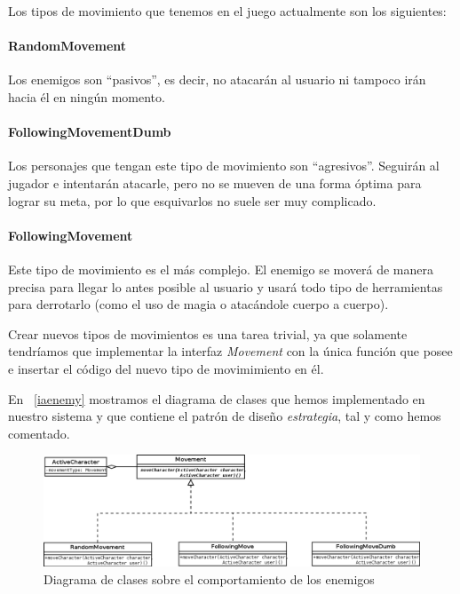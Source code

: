 Los tipos de movimiento que tenemos en el juego actualmente son los siguientes:

\paragraph{RandomMovement} Los enemigos son ``pasivos'', es decir, no atacarán al usuario ni tampoco irán hacia él en ningún momento.

\paragraph{FollowingMovementDumb} Los personajes que tengan este tipo de movimiento son ``agresivos''. Seguirán al jugador e intentarán atacarle, pero no se mueven de una forma óptima para lograr su meta, por lo que esquivarlos no suele ser muy complicado.

\paragraph{FollowingMovement} Este tipo de movimiento es el más complejo. El enemigo se moverá de manera precisa para llegar lo antes posible al usuario y usará todo tipo de herramientas para derrotarlo (como el uso de magia o atacándole cuerpo a cuerpo).

Crear nuevos tipos de movimientos es una tarea trivial, ya que solamente tendríamos que implementar la interfaz \textit{Movement} con la única función que posee e insertar el código del nuevo tipo de movimimiento en él.

En ~\ref{iaenemy} mostramos el diagrama de clases que hemos implementado en nuestro sistema y que contiene el patrón de diseño \textit{estrategia}, tal y como hemos comentado.

\begin{figure}
    \includegraphics[width=\textwidth,height=\textheight,keepaspectratio]{./img/iaenemy.png}
  \caption{Diagrama de clases sobre el comportamiento de los enemigos}
  \label{fig:iaenemy}
\end{figure}
